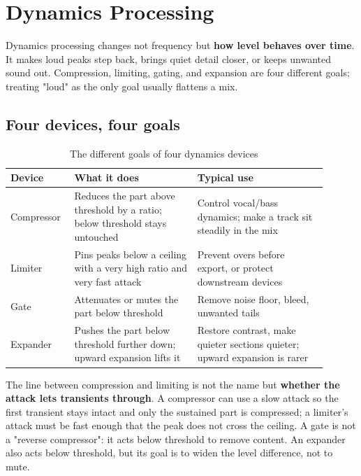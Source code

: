 \chapter{Dynamics Processing}
\label{chap:dynamics}


Dynamics processing changes not frequency but \textbf{how level behaves over time}. It makes loud peaks step back, brings quiet detail closer, or keeps unwanted sound out. Compression, limiting, gating, and expansion are four different goals; treating "loud" as the only goal usually flattens a mix.

\section{Four devices, four goals}

\begin{table}[htbp]
\centering
\small
\begin{tabular}{@{}p{0.16\linewidth}p{0.36\linewidth}p{0.38\linewidth}@{}}
\hline
Device & What it does & Typical use \\
\hline
Compressor & Reduces the part above threshold by a ratio; below threshold stays untouched & Control vocal/bass dynamics; make a track sit steadily in the mix \\
Limiter & Pins peaks below a ceiling with a very high ratio and very fast attack & Prevent overs before export, or protect downstream devices \\
Gate & Attenuates or mutes the part below threshold & Remove noise floor, bleed, unwanted tails \\
Expander & Pushes the part below threshold further down; upward expansion lifts it & Restore contrast, make quieter sections quieter; upward expansion is rarer \\
\hline
\end{tabular}
\caption{The different goals of four dynamics devices}
\label{tab:dynamics-kinds}
\end{table}

The line between compression and limiting is not the name but \textbf{whether the attack lets transients through}. A compressor can use a slow attack so the first transient stays intact and only the sustained part is compressed; a limiter's attack must be fast enough that the peak does not cross the ceiling. A gate is not a "reverse compressor": it acts below threshold to remove content. An expander also acts below threshold, but its goal is to widen the level difference, not to mute.


